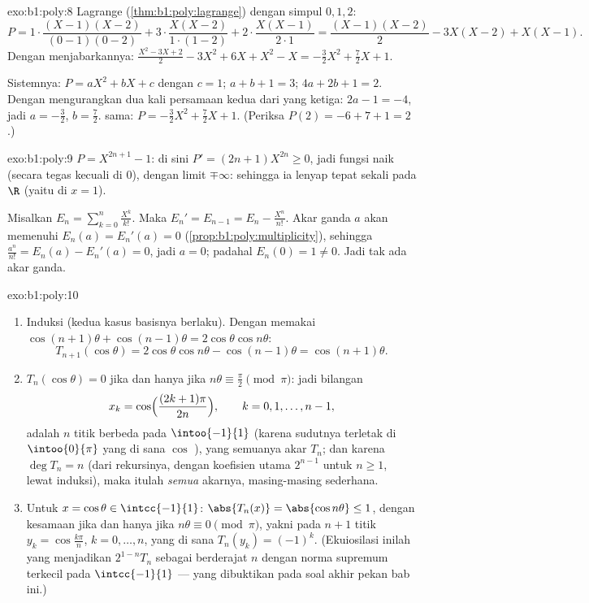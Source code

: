 \begin{solution}{exo:b1:poly:8}
Lagrange (\cref{thm:b1:poly:lagrange}) dengan simpul $0, 1, 2$:
\[
P = 1\cdot\frac{(X-1)(X-2)}{(0-1)(0-2)} + 3\cdot\frac{X(X-2)}{1\cdot(1-2)}
+ 2\cdot\frac{X(X-1)}{2\cdot 1}
= \frac{(X-1)(X-2)}{2} - 3X(X-2) + X(X-1).
\]
Dengan menjabarkannya: $\frac{X^2 - 3X + 2}{2} - 3X^2 + 6X + X^2 - X =
-\frac{3}{2}X^2 + \frac{7}{2}X + 1$.

Sistemnya: $P = aX^2 + bX + c$ dengan $c = 1$; $a + b + 1 = 3$; $4a + 2b +
1 = 2$. Dengan mengurangkan dua kali persamaan kedua dari yang ketiga: $2a - 1 = -4$,
jadi $a = -\frac32$, $b = \frac72$.  sama:
$P = -\frac32 X^2 + \frac72 X + 1$. (Periksa $P(2) = -6 + 7 + 1 = 2$.)
\end{solution}

\begin{solution}{exo:b1:poly:9}
$P = X^{2n+1} - 1$: di sini $P' = (2n+1)X^{2n} \geq 0$, jadi fungsi
 naik (secara tegas kecuali di $0$), dengan limit
$\mp\infty$: sehingga ia lenyap tepat sekali pada $\R$ (yaitu di $x = 1$).

Misalkan $E_n = \sum_{k=0}^{n} \frac{X^k}{k!}$. Maka $E_n' = E_{n-1} = E_n
- \frac{X^n}{n!}$. Akar ganda $a$ akan memenuhi $E_n(a) =
E_n'(a) = 0$ (\cref{prop:b1:poly:multiplicity}), sehingga
$\frac{a^n}{n!} = E_n(a) - E_n'(a) = 0$, jadi $a = 0$; padahal $E_n(0) = 1
\neq 0$. Jadi tak ada akar ganda.
\end{solution}

\begin{solution}{exo:b1:poly:10}
\begin{enumerate}
  \item Induksi (kedua kasus basisnya berlaku). Dengan memakai $\cos(n+1)\theta +
        \cos(n-1)\theta = 2\cos\theta\cos n\theta$:
        \[
        T_{n+1}(\cos\theta) = 2\cos\theta \cos n\theta -
        \cos(n-1)\theta = \cos(n+1)\theta .
        \]
  \item $T_n(\cos\theta) = 0$ jika dan hanya jika $n\theta \equiv \frac\pi2 \pmod
        \pi$: jadi bilangan
        \[
        x_k = \cos\Bigl(\frac{(2k+1)\pi}{2n}\Bigr),
        \qquad k = 0, 1, \dots, n-1,
        \]
        adalah $n$ titik berbeda pada $\intoo{-1}{1}$ (karena sudutnya terletak di
        $\intoo{0}{\pi}$ yang di sana $\cos$ ), yang semuanya akar
        $T_n$; dan karena $\deg T_n = n$ (dari rekursinya, dengan
        koefisien utama $2^{n-1}$ untuk $n \geq 1$, lewat induksi),
        maka itulah \emph{semua} akarnya, masing-masing sederhana.
  \item Untuk $x = \cos\theta \in \intcc{-1}{1}$: $\abs{T_n(x)} =
        \abs{\cos n\theta} \leq 1$, dengan kesamaan jika dan hanya jika $n\theta \equiv
        0 \pmod\pi$, yakni pada $n+1$ titik $y_k =
        \cos\frac{k\pi}{n}$, $k = 0, \dots, n$, yang di sana $T_n(y_k) =
        (-1)^k$. (Ekuiosilasi inilah yang menjadikan $2^{1-n}T_n$ sebagai  berderajat $n$ dengan norma supremum terkecil pada
        $\intcc{-1}{1}$ --- yang dibuktikan pada soal akhir pekan
        bab ini.)
\end{enumerate}
\end{solution}

